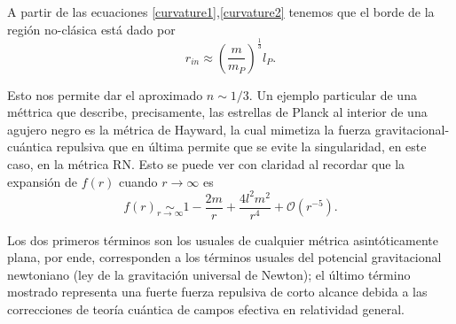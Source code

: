 \documentclass[16pt,a4paper]{article}
\numberwithin{equation}{section}
\theoremstyle{definition}
\begin{document}
A partir de las ecuaciones \eqref{curvature1},\eqref{curvature2} tenemos que el borde de la región no-clásica está dado por
\begin{equation*}
r_{in} \approx \left(\frac{m}{m_P}\right)^{\frac{1}{3}}l_P.
\end{equation*}

Esto nos permite dar el aproximado $n \sim 1/3$. Un ejemplo particular de una méttrica que describe, precisamente, las estrellas de Planck al interior de una agujero negro es la métrica de Hayward, la cual mimetiza la fuerza gravitacional-cuántica repulsiva que en última permite que se evite la singularidad, en este caso, en la métrica RN. Esto se puede ver con claridad al recordar que la expansión de $f(r)$ cuando $r \to \infty$ es
\begin{equation*}
f(r) \underset{r \to \infty}{\sim} 1 - \frac{2m}{r} + \frac{4l^2m^2}{r^4} + \mathcal{O}(r^{-5}).
\end{equation*}

Los dos primeros términos son los usuales de cualquier métrica asintóticamente plana, por ende, corresponden a los términos usuales del potencial gravitacional newtoniano (ley de la gravitación universal de Newton); el último término mostrado representa una fuerte fuerza repulsiva de corto alcance debida a las correcciones de teoría cuántica de campos efectiva en relatividad general.\\
\end{document}
